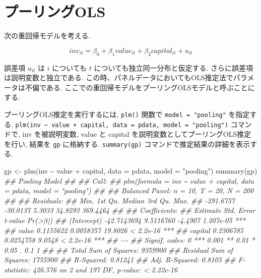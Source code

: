 \documentclass[
  letterpaper,
  xelatex,
  ja=standard, xelatex]{bxjsbook}
\newenvironment{Shaded}{\begin{snugshade}}{\end{snugshade}}
\newcommand{\AttributeTok}[1]{\textcolor[rgb]{0.40,0.45,0.13}{#1}}
\newcommand{\DocumentationTok}[1]{\textcolor[rgb]{0.37,0.37,0.37}{\textit{#1}}}
\newcommand{\FunctionTok}[1]{\textcolor[rgb]{0.28,0.35,0.67}{#1}}
\newcommand{\NormalTok}[1]{\textcolor[rgb]{0.00,0.23,0.31}{#1}}
\newcommand{\OtherTok}[1]{\textcolor[rgb]{0.00,0.23,0.31}{#1}}
\newcommand{\SpecialCharTok}[1]{\textcolor[rgb]{0.37,0.37,0.37}{#1}}
\newcommand{\StringTok}[1]{\textcolor[rgb]{0.13,0.47,0.30}{#1}}
\begin{document}
\section{プーリングOLS}\label{ux30d7ux30fcux30eaux30f3ux30b0ols}

次の重回帰モデルを考える.

\[
inv_{it} = \beta_0 + \beta_1 value_{it} + \beta_2 capital_{it} + u_{it}
\]

誤差項 \(u_{it}\) は \(i\) についても \(t\)
についても独立同一分布と仮定する. さらに誤差項は説明変数と独立である.
この時、パネルデータにおいてもOLS推定法でパラメータは不偏である.
ここでの重回帰モデルをプーリングOLSモデルと呼ぶことにする.

プーリングOLS推定を実行するには, \texttt{plm()} 関数で
\texttt{model\ =\ "pooling"} を指定する.
\texttt{plm(inv\ \textasciitilde{}\ value\ +\ capital,\ data\ =\ pdata,\ model\ =\ "pooling")}
コマンドで, inv を被説明変数, value と capital
を説明変数としてプーリングOLS推定を行い, 結果を \texttt{gp} に格納する.
\texttt{summary(gp)} コマンドで推定結果の詳細を表示する.

\begin{Shaded}
\begin{Highlighting}[]
\NormalTok{gp }\OtherTok{\textless{}{-}} \FunctionTok{plm}\NormalTok{(inv }\SpecialCharTok{\textasciitilde{}}\NormalTok{ value }\SpecialCharTok{+}\NormalTok{ capital, }\AttributeTok{data =}\NormalTok{ pdata, }\AttributeTok{model =} \StringTok{"pooling"}\NormalTok{)}
\FunctionTok{summary}\NormalTok{(gp)}
\DocumentationTok{\#\# Pooling Model}
\DocumentationTok{\#\# }
\DocumentationTok{\#\# Call:}
\DocumentationTok{\#\# plm(formula = inv \textasciitilde{} value + capital, data = pdata, model = "pooling")}
\DocumentationTok{\#\# }
\DocumentationTok{\#\# Balanced Panel: n = 10, T = 20, N = 200}
\DocumentationTok{\#\# }
\DocumentationTok{\#\# Residuals:}
\DocumentationTok{\#\#      Min.   1st Qu.    Median   3rd Qu.      Max. }
\DocumentationTok{\#\# {-}291.6757  {-}30.0137    5.3033   34.8293  369.4464 }
\DocumentationTok{\#\# }
\DocumentationTok{\#\# Coefficients:}
\DocumentationTok{\#\#                Estimate  Std. Error t{-}value  Pr(\textgreater{}|t|)    }
\DocumentationTok{\#\# (Intercept) {-}42.7143694   9.5116760 {-}4.4907 1.207e{-}05 ***}
\DocumentationTok{\#\# value         0.1155622   0.0058357 19.8026 \textless{} 2.2e{-}16 ***}
\DocumentationTok{\#\# capital       0.2306785   0.0254758  9.0548 \textless{} 2.2e{-}16 ***}
\DocumentationTok{\#\# {-}{-}{-}}
\DocumentationTok{\#\# Signif. codes:  0 \textquotesingle{}***\textquotesingle{} 0.001 \textquotesingle{}**\textquotesingle{} 0.01 \textquotesingle{}*\textquotesingle{} 0.05 \textquotesingle{}.\textquotesingle{} 0.1 \textquotesingle{} \textquotesingle{} 1}
\DocumentationTok{\#\# }
\DocumentationTok{\#\# Total Sum of Squares:    9359900}
\DocumentationTok{\#\# Residual Sum of Squares: 1755900}
\DocumentationTok{\#\# R{-}Squared:      0.81241}
\DocumentationTok{\#\# Adj. R{-}Squared: 0.8105}
\DocumentationTok{\#\# F{-}statistic: 426.576 on 2 and 197 DF, p{-}value: \textless{} 2.22e{-}16}
\end{Highlighting}
\end{Shaded}
\end{document}
